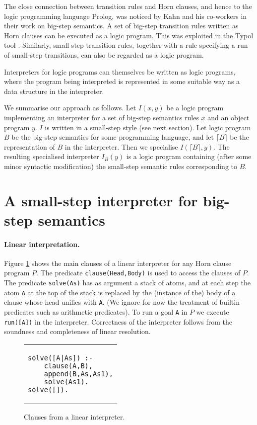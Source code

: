 \documentclass{llncs}
\begin{document}
The close connection between transition rules and Horn clauses, and hence to the logic programming language Prolog, 
was noticed by Kahn and his co-workers in their work on big-step semantics.
A set of big-step transition rules written as Horn clauses can be executed as a logic program. This was exploited in
the Typol tool \cite{Typol}. Similarly, small step transition rules, together with a rule specifying a run of
small-step transitions, can also be regarded as a logic program.

Interpreters for logic programs can themselves be written as logic programs, where the program being interpreted 
is represented in some suitable way as a data structure in the interpreter.  

We summarise our approach as follows.  Let $I(x,y)$ be a logic program implementing an interpreter for a set of
big-step semantics rules $x$ and an object program $y$. $I$ is written in a small-step style (see next section).  Let logic program $B$ be the big-step semantics
for some programming language, and let $\lceil B \rceil$ be the representation of $B$ in the interpreter.  Then we specialise 
$I(\lceil B \rceil,y)$.  The resulting specialised interpreter $I_B(y)$ is a logic program containing (after some minor syntactic modification) 
the small-step semantic rules
corresponding to $B$.

\section{A small-step interpreter for big-step semantics}

\paragraph{Linear interpretation.}  Figure \ref{fig:linear-interp} shows the main clauses of a linear interpreter for any Horn clause program $P$.  
The predicate \texttt{clause(Head,Body)} is used to access the clauses of $P$.  The predicate \texttt{solve(As)} has as argument a stack of atoms, and
at each step the atom  \texttt{A} at the top of the stack is replaced by the (instance of the) body of a clause whose head unifies with \texttt{A}.
(We ignore for now the treatment of builtin predicates such as arithmetic predicates).
To run a goal \texttt{A} in $P$ we execute \texttt{run([A])} in the interpreter.  
Correctness of the interpreter follows from the soundness and completeness of linear resolution.
\begin{figure}
\begin{tabular}{l}
\begin{lstlisting}
solve([A|As]) :- 
	clause(A,B),
	append(B,As,As1),
	solve(As1).
solve([]).
\end{lstlisting}
\end{tabular}
\caption{Clauses from a linear interpreter.}\label{fig:linear-interp}
\end{figure}
\end{document}
